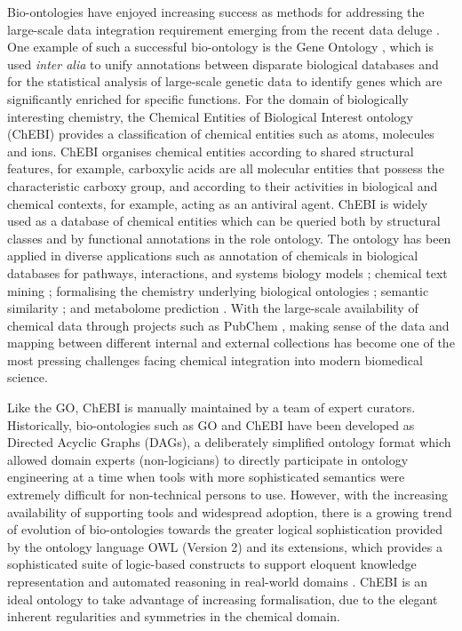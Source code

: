 \documentclass[10pt]{bmc_article}
\newenvironment{bmcformat}{\baselineskip20pt\sloppy\setboolean{publ}{false}}{\baselineskip20pt\sloppy}
\begin{document}
\begin{bmcformat}
Bio-ontologies have enjoyed increasing success as methods for addressing the large-scale data integration requirement emerging from the recent data deluge \cite{Harland2011940}. One example of such a successful bio-ontology is the Gene Ontology \cite{go2000}, which is used \textit{inter alia} to unify annotations between disparate biological databases and for the statistical analysis of large-scale genetic data to identify genes which are significantly enriched for specific functions.  For the domain of biologically interesting chemistry, the Chemical Entities of Biological Interest ontology (ChEBI) \cite{chebi2010} provides a classification of chemical entities such as atoms, molecules and ions.  ChEBI organises chemical entities according to shared structural features, for example, carboxylic acids are all molecular entities that possess the characteristic carboxy group, and according to their activities in biological and chemical contexts, for example, acting as an antiviral agent. ChEBI is widely used as a database of chemical entities which can be queried both by structural classes and by functional annotations in the role ontology. The ontology has been applied in diverse applications such as annotation of chemicals in biological databases for pathways, interactions, and systems biology models \cite{matthews2009,libiomodels2010,kerrien2007}; chemical text mining \cite{corbett2006}; formalising the chemistry underlying biological ontologies \cite{mungall2010}; semantic similarity \cite{couto2010}; and metabolome prediction \cite{swainston2010}. With the large-scale availability of chemical data through projects such as PubChem \cite{bolton2008}, making sense of the data and mapping between different internal and external collections has become one of the most pressing challenges facing chemical integration into modern biomedical science. 

Like the GO, ChEBI is manually maintained by a team of expert curators.  Historically, bio-ontologies such as GO and ChEBI have been developed as Directed Acyclic Graphs (DAGs), a deliberately simplified ontology format which allowed domain experts (non-logicians) to directly participate in ontology engineering at a time when tools with more sophisticated semantics were extremely difficult for non-technical persons to use. However, with the increasing availability of supporting tools and widespread adoption, there is a growing trend of evolution of bio-ontologies towards the greater logical sophistication provided by the ontology language OWL (Version 2) \cite{OWL2NextStep} and its extensions, which provides a sophisticated suite of logic-based constructs to support eloquent knowledge representation and automated reasoning in real-world domains \cite{alterovitz2010}.  ChEBI is an ideal ontology to take advantage of increasing formalisation, due to the elegant inherent regularities and symmetries in the chemical domain.  


\end{bmcformat}
\end{document}
